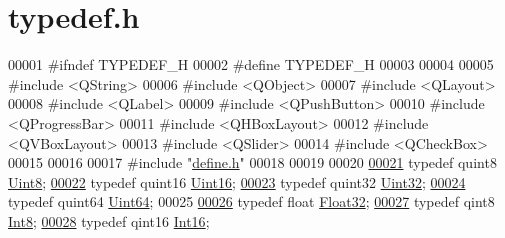 \hypertarget{a00001_source}{\section{typedef.\+h}
\label{a00001_source}
}

\begin{DoxyCode}
00001 \textcolor{preprocessor}{#ifndef TYPEDEF\_H}
00002 \textcolor{preprocessor}{#define TYPEDEF\_H}
00003 
00004 
00005 \textcolor{preprocessor}{#include <QString>}
00006 \textcolor{preprocessor}{#include <QObject>}
00007 \textcolor{preprocessor}{#include <QLayout>}
00008 \textcolor{preprocessor}{#include <QLabel>}
00009 \textcolor{preprocessor}{#include <QPushButton>}
00010 \textcolor{preprocessor}{#include <QProgressBar>}
00011 \textcolor{preprocessor}{#include <QHBoxLayout>}
00012 \textcolor{preprocessor}{#include <QVBoxLayout>}
00013 \textcolor{preprocessor}{#include <QSlider>}
00014 \textcolor{preprocessor}{#include <QCheckBox>}
00015 
00016 
00017 \textcolor{preprocessor}{#include "\hyperlink{a00034}{define.h}"}
00018 
00019 
00020 
\hypertarget{a00001_source_l00021}{}\hyperlink{a00001_a979e3e23b9a449e69ab6a8a83b6042f8}{00021} \textcolor{keyword}{typedef} quint8               \hyperlink{a00001_a979e3e23b9a449e69ab6a8a83b6042f8}{Uint8};
\hypertarget{a00001_source_l00022}{}\hyperlink{a00001_aae7407b021d43f7193a81a58cfb3e297}{00022} \textcolor{keyword}{typedef} quint16              \hyperlink{a00001_aae7407b021d43f7193a81a58cfb3e297}{Uint16};
\hypertarget{a00001_source_l00023}{}\hyperlink{a00001_ab56a7153a5b218eac7698ff141009735}{00023} \textcolor{keyword}{typedef} quint32              \hyperlink{a00001_ab56a7153a5b218eac7698ff141009735}{Uint32};
\hypertarget{a00001_source_l00024}{}\hyperlink{a00001_a3ea80e954e940df6ac162951653f72c4}{00024} \textcolor{keyword}{typedef} quint64              \hyperlink{a00001_a3ea80e954e940df6ac162951653f72c4}{Uint64};
00025 
\hypertarget{a00001_source_l00026}{}\hyperlink{a00001_a87d38f886e617ced2698fc55afa07637}{00026} \textcolor{keyword}{typedef} \textcolor{keywordtype}{float}                \hyperlink{a00001_a87d38f886e617ced2698fc55afa07637}{Float32};
\hypertarget{a00001_source_l00027}{}\hyperlink{a00001_aafb609548b1aa0152c46f9205b79d0f0}{00027} \textcolor{keyword}{typedef} qint8                \hyperlink{a00001_aafb609548b1aa0152c46f9205b79d0f0}{Int8};
\hypertarget{a00001_source_l00028}{}\hyperlink{a00001_a3985266aecb120f269789241c170850c}{00028} \textcolor{keyword}{typedef} qint16               \hyperlink{a00001_a3985266aecb120f269789241c170850c}{Int16};

\end{DoxyCode}
